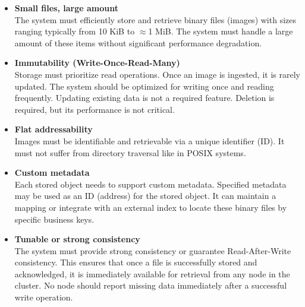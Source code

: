 \begin{itemize}
    \item \textbf{Small files, large amount} \\
    The system must efficiently store and retrieve binary files (images) with sizes ranging typically from 10 KiB to $\approx$1 MiB. The system must handle a large amount of these items without significant performance degradation.
    \item \textbf{Immutability (Write-Once-Read-Many)} \\
    Storage must prioritize read operations. Once an image is ingested, it is rarely updated. The system should be optimized for writing once and reading frequently. Updating existing data is not a required feature. Deletion is required, but its performance is not critical.
    \item \textbf{Flat addressability} \\
    Images must be identifiable and retrievable via a unique identifier (ID). It must not suffer from directory traversal like in POSIX systems.
    \item \textbf{Custom metadata} \\
    Each stored object needs to support custom metadata. Specified metadata may be used as an ID (address) for the stored object. It can maintain a mapping or integrate with an external index to locate these binary files by specific business keys.
    \item \textbf{Tunable or strong consistency} \\
    The system must provide strong consistency or guarantee Read-After-Write consistency. This ensures that once a file is successfully stored and acknowledged, it is immediately available for retrieval from any node in the cluster. No node should report missing data immediately after a successful write operation.
\end{itemize}

